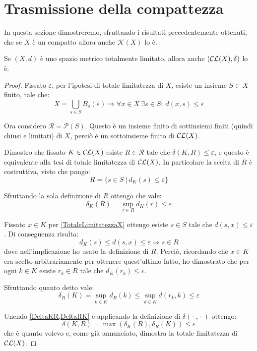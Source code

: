 \section{Trasmissione della compattezza}
In questa sezione dimostreremo, sfruttando i risultati precedentemente ottenuti, che se $X$ è un compatto allora anche $\mathcal{K}(X)$ lo è.

\begin{lemma}\label{TotaleLimitatezzaKX}
	Se $(X,d)$ è uno spazio metrico totalmente limitato, allora anche $(\mathcal{CL}(X),\delta)$ lo è.
\end{lemma}
\begin{proof}
	Fissato $\varepsilon$, per l'ipotesi di totale limitatezza di $X$, esiste un insieme $S\subset X$ finito, tale che:
	\begin{equation}\label{TotaleLimitatezzaX}
		X=\bigcup_{s\in S} B_{s}(\varepsilon) \Longrightarrow 
		\forall x\in X\ \exists s\in S:\ d(x,s)\le \varepsilon
	\end{equation}

	Ora considero $\mathcal{R}=\mathcal{P}(S)$. Questo è un insieme finito di sottinsiemi finiti (quindi chiusi e limitati) di $X$, perciò è un sottoinsieme finito di $\mathcal{CL}(X)$. 
	
	Dimostro che fissato $K\in\mathcal{CL}(X)$ esiste $R\in \mathcal{R}$ tale che $\delta(K,R)\le \varepsilon$, e questo è equivalente alla tesi di totale limitatezza di $\mathcal{CL}(X)$. In particolare la scelta di $R$ è costruttiva, visto che pongo:
	\begin{equation*}
		R=\{s\in S\ |\ d_K(s)\le \varepsilon\}
	\end{equation*}
	
	Sfruttando la sola definizione di $R$ ottengo che vale:
	\begin{equation}\label{DeltaKR}
		\delta_K(R)=\sup_{r\in R} d_K(r) \le \varepsilon
	\end{equation}
	
	Fissato $x\in K$ per \cref{TotaleLimitatezzaX} ottengo esiste $s\in S$ tale che $d(s,x)\le \varepsilon$. Di conseguenza risulta:
	\begin{equation*}
		d_K(s)\le d(s,x) \le \varepsilon \Longrightarrow s\in R
	\end{equation*}
	dove nell'implicazione ho usato la definizione di $R$.
	Perciò, ricordando che $x\in K$ era scelto arbitrariamente per ottenere quest'ultimo fatto, ho dimostrato che per ogni $k\in K$ esiste $r_k\in R$ tale che $d_K(r_k)\le \varepsilon$.
	
	Sfruttando quanto detto vale:
	\begin{equation}\label{DeltaRK}
		\delta_R(K)=\sup_{k\in K} d_R(k) \le \sup_{k\in K} d(r_k,k) \le \varepsilon
	\end{equation}
	
	Unendo \cref{DeltaKR,DeltaRK} e applicando la definizione di $\delta({}\cdot{},{}\cdot{})$ ottengo:
	\begin{equation*}
		\delta(K,R)=\max\left(\delta_K(R),\delta_R(K)\right)\le \varepsilon
	\end{equation*}
	che è quanto volevo e, come già annunciato, dimostra la totale limitatezza di $\mathcal{CL}(X)$.
\end{proof}

